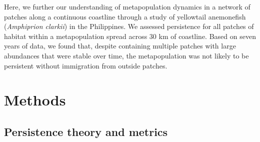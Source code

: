 \documentclass[12pt, oneside]{article}   	%
\begin{document}

Here, we further our understanding of metapopulation dynamics in a network of patches along a continuous coastline through a study of yellowtail anemonefish (\textit{Amphiprion clarkii}) in the Philippines. We assessed persistence for all patches of habitat within a metapopulation spread across 30 km of coastline. Based on seven years of data, we found that, despite containing multiple patches with large abundances that were stable over time, the metapopulation was not likely to be persistent without immigration from outside patches.

\section*{Methods} %

\subsection*{Persistence theory and metrics}
\end{document}
